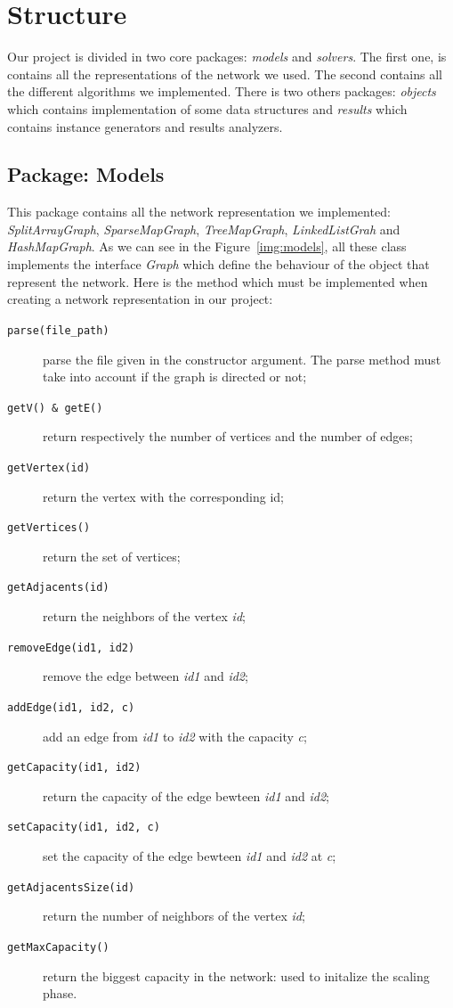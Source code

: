 \section{Structure}

Our project is divided in two core packages: \textit{models} and \textit{solvers}. The first one, is contains all the representations of the network we used. The second contains all the different algorithms we implemented. There is two others packages: \textit{objects} which contains implementation of some data structures and \textit{results} which contains instance generators and results analyzers.

\subsection{Package: Models}

This package contains all the network representation we implemented: \textit{SplitArrayGraph}, \textit{SparseMapGraph}, \textit{TreeMapGraph}, \textit{LinkedListGrah} and \textit{HashMapGraph}. As we can see in the Figure~\ref{img:models}, all these class implements the interface \textit{Graph} which define the behaviour of the object that represent the network. Here is the method which must be implemented when creating a network representation in our project:
\begin{description}
	\item[\texttt{parse(file\_path)}] parse the file given in the constructor argument. The parse method must take into account if the graph is directed or not;
	\item[\texttt{getV() \& getE()}] return respectively the number of vertices and the number of edges;
	\item[\texttt{getVertex(id)}] return the vertex with the corresponding id;
	\item[\texttt{getVertices()}] return the set of vertices;
	\item[\texttt{getAdjacents(id)}] return the neighbors of the vertex \textit{id};
	\item[\texttt{removeEdge(id1, id2)}] remove the edge between \textit{id1} and \textit{id2};
	\item[\texttt{addEdge(id1, id2, c)}] add an edge from \textit{id1} to \textit{id2} with the capacity \textit{c};
	\item[\texttt{getCapacity(id1, id2)}] return the capacity of the edge bewteen \textit{id1} and \textit{id2};
	\item[\texttt{setCapacity(id1, id2, c)}] set the capacity of the edge bewteen \textit{id1} and \textit{id2} at \textit{c};
	\item[\texttt{getAdjacentsSize(id)}] return the number of neighbors of the vertex \textit{id};
	\item[\texttt{getMaxCapacity()}] return the biggest capacity in the network: used to initalize the scaling phase.
\end{description}

